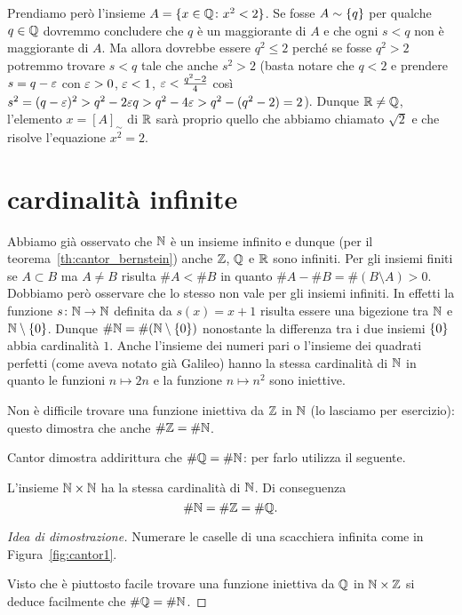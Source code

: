 Prendiamo però l'insieme $A=\{x\in {\mathbb Q}\colon x^2<2\}$.
Se fosse $A\sim {\left\{ q \right\}}$ per qualche $q\in {\mathbb Q}$ dovremmo 
concludere che $q$ è un maggiorante di $A$ e che ogni $s<q$ 
non è maggiorante di $A$. 
Ma allora dovrebbe essere $q^2\le 2$ perché se fosse $q^2>2$
potremmo trovare $s<q$ tale che anche $s^2>2$ 
(basta notare che $q<2$ e prendere $s=q-\varepsilon$ con $\varepsilon>0$, $\varepsilon<1$, 
$\varepsilon<\frac{q^2-2}{4}$ così $s^2=(q-\varepsilon)^2 > q^2-2\varepsilon q > q^2-4\varepsilon
> q^2-(q^2-2) = 2$).
Dunque ${\mathbb R}\neq {\mathbb Q}$, l'elemento $x=[A]_\sim$ di ${\mathbb R}$ sarà 
proprio quello che abbiamo chiamato $\sqrt 2$ e che risolve 
l'equazione $x^2=2$. 

\section{cardinalità infinite}

Abbiamo già osservato che ${\mathbb N}$ è un insieme infinito e dunque (per il teorema~\ref{th:cantor_bernstein})
anche ${\mathbb Z}$, ${\mathbb Q}$ e ${\mathbb R}$ sono infiniti.
Per gli insiemi finiti se $A\subset B$ ma $A\neq B$ risulta $\#A < \# B$
in quanto $\#A - \#B = \#(B\setminus A) > 0$. 
Dobbiamo però osservare che lo stesso non vale per gli insiemi infiniti.
In effetti la funzione $s\colon {\mathbb N} \to {\mathbb N}$ definita da $s(x)=x+1$
risulta essere una bigezione tra ${\mathbb N}$ e ${\mathbb N}\setminus{\left\{ 0 \right\}}$. 
Dunque $\#{\mathbb N} = \#({\mathbb N}\setminus{\left\{ 0 \right\}})$ 
nonostante la differenza tra i due insiemi ${\left\{ 0 \right\}}$ abbia 
cardinalità $1$. 
Anche l'insieme dei numeri pari o l'insieme 
dei quadrati perfetti (come aveva notato già Galileo)
hanno la stessa cardinalità di ${\mathbb N}$ in quanto le funzioni $n\mapsto 2n$
e la funzione $n\mapsto n^2$ sono iniettive.

Non è difficile trovare una funzione iniettiva da ${\mathbb Z}$ in ${\mathbb N}$
(lo lasciamo per esercizio): questo dimostra che anche $\#{\mathbb Z} = \# {\mathbb N}$.

Cantor dimostra addirittura che $\#{\mathbb Q} = \#{\mathbb N}$: per farlo utilizza il seguente.

\begin{theorem}
\label{th:Cantor_primo}%
%
L'insieme ${\mathbb N} \times {\mathbb N}$ ha la stessa cardinalità di ${\mathbb N}$. Di conseguenza
\[
  \# {\mathbb N} = \# {\mathbb Z} = \# {\mathbb Q}.
  \]
\end{theorem}
%
\begin{proof}[Idea di dimostrazione]
  Numerare le caselle di una scacchiera infinita
  come in Figura~\ref{fig:cantor1}.
  
  Visto che è piuttosto facile trovare una funzione iniettiva 
  da ${\mathbb Q}$ in ${\mathbb N} \times {\mathbb Z}$ si deduce facilmente che $\#{\mathbb Q} = \#{\mathbb N}$.
\end{proof}

